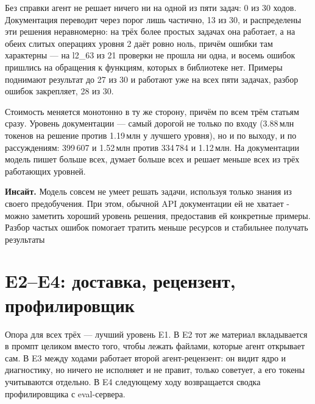 \documentclass[10pt,a4paper]{article}
\newcommand{\insight}[1]{\par\smallskip\noindent\textbf{Инсайт.} #1\par\smallskip}
\begin{document}
Без справки агент не решает ничего ни на одной из пяти задач: 0 из 30 ходов. Документация
переводит через порог лишь частично, 13 из 30, и распределены эти решения неравномерно: на
трёх более простых задачах она работает, а на обеих слитых операциях уровня 2 даёт ровно
ноль, причём ошибки там характерны --- на l2\_63 из 21 проверки не прошла ни одна, и восемь
ошибок пришлись на обращения к функциям, которых в библиотеке нет. Примеры поднимают
результат до 27 из 30 и работают уже на всех пяти задачах, разбор ошибок закрепляет, 28 из 30.

Стоимость меняется монотонно в ту же сторону, причём по всем трём статьям сразу. Уровень
документации --- самый дорогой не только по входу (3.88\,млн токенов на решение против
1.19\,млн у лучшего уровня), но и по выходу, и по рассуждениям: 399\,607 и 1.52\,млн против
334\,784 и 1.12\,млн. На документации модель пишет больше всех, думает больше всех и решает
меньше всех из трёх работающих уровней.

\insight{Модель совсем не умеет решать задачи, используя только знания из своего предобучения. При этом, обычной API документации ей не хватает - можно заметить хороший уровень решения, предоставив ей конкретные примеры. Разбор частых ошибок помогает тратить меньше ресурсов и стабильнее получать результаты}

\section{E2--E4: доставка, рецензент, профилировщик}
\label{sec:e234}

Опора для всех трёх --- лучший уровень E1. В E2 тот же материал вкладывается в промпт
целиком вместо того, чтобы лежать файлами, которые агент открывает сам. В E3 между ходами
работает второй агент-рецензент: он видит ядро и диагностику, но ничего не исполняет и не
правит, только советует, а его токены учитываются отдельно. В E4 следующему ходу
возвращается сводка профилировщика с eval-сервера.
\end{document}
